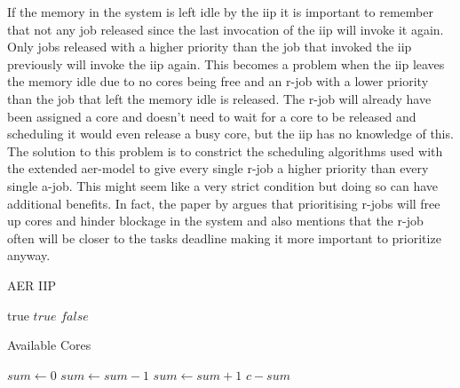 \documentclass{kththesis}
\begin{document}
If the memory in the system is left idle by the \acrshort{iip} it is important to remember that
not any job released since the last invocation of the \acrshort{iip} will invoke it again. Only jobs
released with a higher priority than the job that invoked the \acrshort{iip} previously will invoke
the \acrshort{iip} again. This becomes a problem when the \acrshort{iip} leaves the memory idle due
to no cores being free and an \acrshort{r}-job with a lower priority than the job that left the
memory idle is released. The \acrshort{r}-job will already have been assigned a core and doesn't
need to wait for a core to be released and scheduling it would even release a busy core, but the
\acrshort{iip} has no knowledge of this. The solution to this problem is to constrict the scheduling
algorithms used with the extended \acrshort{aer}-model to give every single \acrshort{r}-job a
higher priority than every single \acrshort{a}-job. This might seem like a very strict condition but
doing so can have additional benefits. In fact, the paper by \textcite{becker_contention-free_2016}
argues that prioritising \acrshort{r}-jobs will free up cores and hinder blockage in the system and
also mentions that the \acrshort{r}-job often will be closer to the tasks deadline making it more
important to prioritize anyway.

\begin{algorithm}
    \caption{AER IIP}
    \label{algo:aer_iip}
    \begin{algorithmic}[1]
                \State \Return true
            \Else
                    \State \Return $true$
                \Else
                    \State \Return $false$
                \EndIf
            \EndIf
        \EndFunction
    \end{algorithmic}
\end{algorithm}

\begin{algorithm}
    \caption{Available Cores}
    \label{algo:available_cores}
    \begin{algorithmic}[1]
            \State $sum\gets 0$
                    \State $sum\gets sum-1$
                    \State $sum\gets sum+1$
                \EndIf
            \EndFor
            \State \Return $c - sum$
        \EndFunction
    \end{algorithmic}
\end{algorithm}
\end{document}
